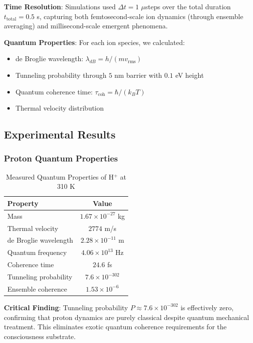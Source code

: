 \documentclass[12pt,a4paper]{article}
\begin{document}
\textbf{Time Resolution}: Simulations used $\Delta t = 1$ $\mu$steps over the total duration $t_{\text{total}} = 0.5$ s, capturing both femtosecond-scale ion dynamics (through ensemble averaging) and millisecond-scale emergent phenomena.

\textbf{Quantum Properties}: For each ion species, we calculated:
\begin{itemize}
\item de Broglie wavelength: $\lambda_{dB} = h/(mv_{\text{rms}})$
\item Tunneling probability through $5$ nm barrier with $0.1$ eV height
\item Quantum coherence time: $\tau_{\text{coh}} = \hbar/(k_B T)$
\item Thermal velocity distribution
\end{itemize}

\subsection{Experimental Results}

\subsubsection{Proton Quantum Properties}

\begin{table}[H]
\centering
\caption{Measured Quantum Properties of H$^+$ at 310 K}
\begin{tabular}{lc}
\toprule
Property & Value \\
\midrule
Mass & $1.67 \times 10^{-27}$ kg \\
Thermal velocity & $2774$ m/s \\
de Broglie wavelength & $2.28 \times 10^{-11}$ m \\
Quantum frequency & $4.06 \times 10^{13}$ Hz \\
Coherence time & $24.6$ fs \\
Tunneling probability & $7.6 \times 10^{-302}$ \\
Ensemble coherence & $1.53 \times 10^{-6}$ \\
\bottomrule
\end{tabular}
\end{table}

\textbf{Critical Finding}: Tunneling probability $P \approx 7.6 \times 10^{-302}$ is effectively zero, confirming that proton dynamics are purely classical despite quantum mechanical treatment. This eliminates exotic quantum coherence requirements for the consciousness substrate.
\end{document}
